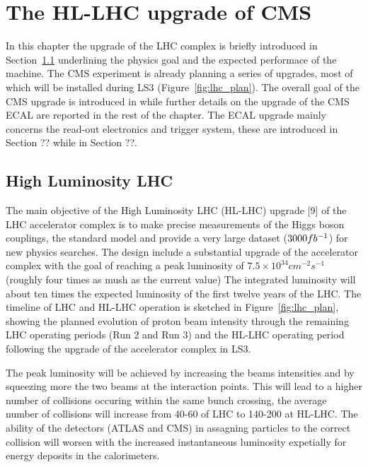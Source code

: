 \chapter{The HL-LHC upgrade of CMS}
\label{chapter:cms_upgrade}

In this chapter the upgrade of the LHC complex is briefly introduced in Section~\ref{upgrade_lhc}
underlining the physics goal and the expected performace of the machine. The CMS experiment is already planning
a series of upgrades, most of which will be installed during LS3 (Figure~\ref{fig:lhc_plan}).
The overall goal of the CMS upgrade is introduced in  while
further details on the upgrade of the CMS ECAL are reported in the rest of the chapter.
The ECAL upgrade mainly concerns the read-out electronics and trigger system, these are introduced in Section ??
while in Section ??.

\section{High Luminosity LHC}
\label{upgrade_lhc}

The main objective of the High Luminosity LHC (HL-LHC) upgrade [9] of the LHC accelerator complex
is to make precise measurements of the Higgs boson couplings, the standard model and provide a very
large dataset ($3000fb^{-1}$) for new physics searches.
The design include a substantial upgrade of the accelerator complex with the goal of reaching
a peak luminosity of $7.5\times10^{34} cm^{-2}s^{-1}$ (roughly four times as mush as the current value)
The integrated luminosity will about ten times the expected luminosity of the first twelve
years of the LHC.
The timeline of LHC and HL-LHC operation is sketched in Figure~\ref{fig:lhc_plan}, showing the planned
evolution of proton beam intensity through the remaining LHC operating periods (Run 2 and Run 3)
and the HL-LHC operating period following the upgrade of the accelerator complex in LS3.

The peak luminosity will be achieved by increasing the beams intensities and by squeezing more the two beams at the
interaction points. This will lead to a higher number of collisions occuring within the same bunch crossing, the
average number of collisions will increase from 40-60 of LHC to 140-200 at HL-LHC.
The ability of the detectors (ATLAS and CMS) in assagning particles to the correct collision will worsen with the
increased instantaneous luminosity expetially for energy deposits in the calorimeters.


